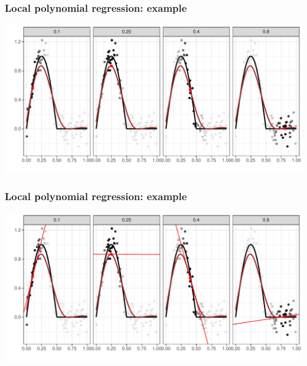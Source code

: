 \documentclass[pdf]{beamer}\usepackage[]{graphicx}\usepackage[]{color}
\makeatletter
\def\maxwidth{ %
  \ifdim\Gin@nat@width>\linewidth
    \linewidth
  \else
    \Gin@nat@width
  \fi
}
\newenvironment{knitrout}{}{} %
\makeatother
\begin{document}
\begin{frame}
\frametitle{Local polynomial regression: example}
\begin{knitrout}
\color{fgcolor}

{\centering \includegraphics[width=\maxwidth]{figure/LoessExplanation_3-1} 

}



\end{knitrout}

\end{frame}


\begin{frame}
\frametitle{Local polynomial regression: example}
\begin{knitrout}
\color{fgcolor}

{\centering \includegraphics[width=\maxwidth]{figure/LoessExplanation_4-1} 

}



\end{knitrout}

\end{frame}
\end{document}
